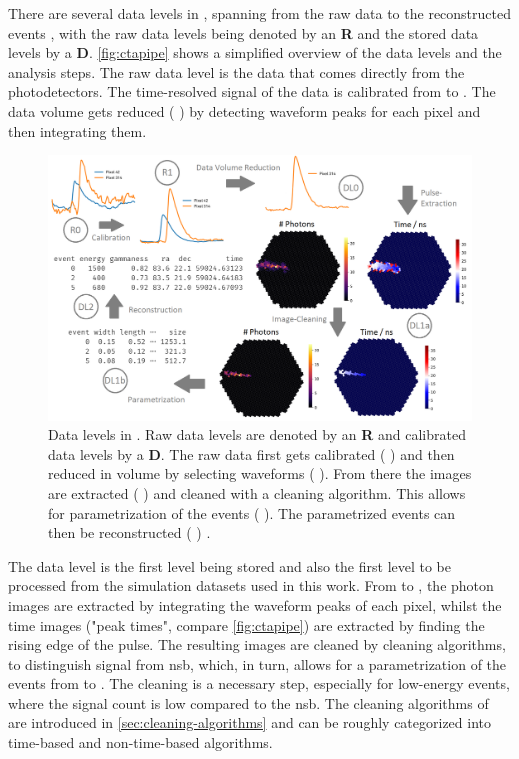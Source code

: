 There are several data levels in \ctapipe{}, spanning from the raw data \rzero{} to the reconstructed events
\dlt{}, with the raw data levels being denoted by an \textbf{R} and the stored data levels by a \textbf{D}.
\autoref{fig:ctapipe} shows a simplified overview of the data levels and the analysis steps.
The raw data level \rzero{} is the data that comes directly from the photodetectors. The time-resolved
signal of the data is calibrated from \rzero{} to \rone{}. The data volume gets reduced
(\rone{} \rightarrow \dlz{}) by detecting waveform peaks for each pixel and then integrating them.
\begin{figure}
    \centering
    \includegraphics[width=\textwidth]{graphics/ctapipe.png}
    \caption{Data levels in \ctapipe{}. Raw data levels are denoted by an \textbf{R} and calibrated
    data levels by a \textbf{D}. The raw data first gets calibrated (\rzero{} \rightarrow \rone{})
    and then reduced in volume by selecting waveforms (\rone{} \rightarrow \dlz{}). From there the
    images are extracted (\dlz{} \rightarrow \dloa{}) and cleaned with a cleaning algorithm. This
    allows for parametrization of the events (\dloa{} \rightarrow \dlob{}). The parametrized events
    can then be reconstructed (\dlob{} \rightarrow \dlt{}) \cite{noethe_thesis, hackfeld}.}
    \label{fig:ctapipe}
\end{figure}

The \dlz{} data level is the first level being stored and also the first level to be processed from
the simulation datasets used in this work. From \dlz{} to \dloa{}, the photon images are extracted
by integrating the waveform peaks of each pixel, whilst the time images ("peak times", compare \autoref{fig:ctapipe})
are extracted by finding the rising edge of the pulse. The resulting images are cleaned by cleaning algorithms,
to distinguish signal from \gls{nsb}, which, in turn, allows for a parametrization of the events from \dloa{} to \dlob{}.
The cleaning is a necessary step, especially for
low-energy events, where the signal count is low compared to the \gls{nsb}. The cleaning algorithms
of \ctapipe{} are introduced in \autoref{sec:cleaning-algorithms} and can be roughly categorized into
time-based and non-time-based algorithms.

